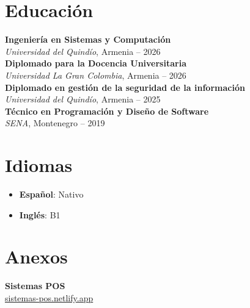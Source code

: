 \documentclass[11pt,a4paper]{article}
\begin{document}
\noindent
\begin{minipage}[t]{0.25\textwidth}
\raggedright

\section*{Educación}
\textbf{Ingeniería en Sistemas y Computación}\\
\textit{Universidad del Quindío}, Armenia -- 2026\\[6pt]

\textbf{Diplomado para la Docencia Universitaria}\\
\textit{Universidad La Gran Colombia}, Armenia -- 2026\\[6pt]

\textbf{Diplomado en gestión de la seguridad de la información}\\
\textit{Universidad del Quindío}, Armenia -- 2025\\[6pt]

\textbf{Técnico en Programación y Diseño de Software}\\
\textit{SENA}, Montenegro -- 2019\\[6pt]


\section*{Idiomas}
\begin{itemize}
  \item \textbf{Español}: Nativo\\[4pt]
  \item \textbf{Inglés}: B1\\[12pt]
\end{itemize}

\section*{Anexos}
\textbf{Sistemas POS}\\[4pt]
\href{https://sistemas-pos.netlify.app/}{sistemas-pos.netlify.app}

\end{minipage}
\hfill
\end{document}
